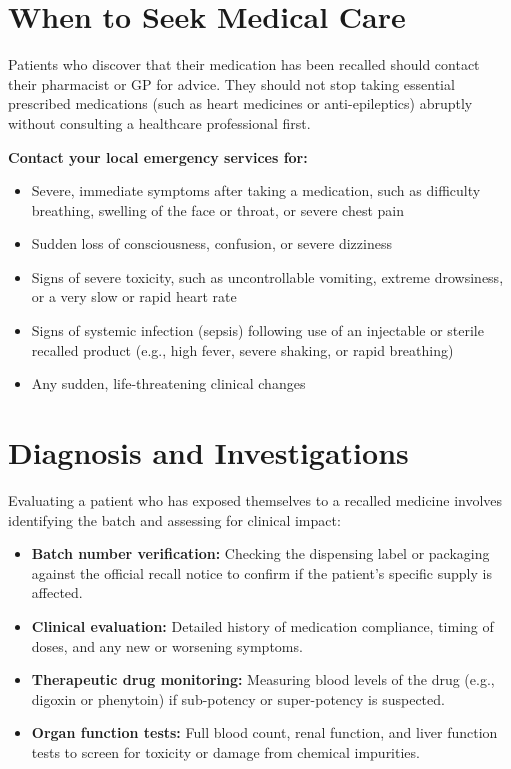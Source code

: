\section*{When to Seek Medical Care}
Patients who discover that their medication has been recalled should contact their pharmacist or GP for advice. They should not stop taking essential prescribed medications (such as heart medicines or anti-epileptics) abruptly without consulting a healthcare professional first.

\textbf{Contact your local emergency services for:}
\begin{itemize}
    \item Severe, immediate symptoms after taking a medication, such as difficulty breathing, swelling of the face or throat, or severe chest pain
    \item Sudden loss of consciousness, confusion, or severe dizziness
    \item Signs of severe toxicity, such as uncontrollable vomiting, extreme drowsiness, or a very slow or rapid heart rate
    \item Signs of systemic infection (sepsis) following use of an injectable or sterile recalled product (e.g., high fever, severe shaking, or rapid breathing)
    \item Any sudden, life-threatening clinical changes
\end{itemize}

\section*{Diagnosis and Investigations}
Evaluating a patient who has exposed themselves to a recalled medicine involves identifying the batch and assessing for clinical impact:

\begin{itemize}
    \item \textbf{Batch number verification:} Checking the dispensing label or packaging against the official recall notice to confirm if the patient's specific supply is affected.
    \item \textbf{Clinical evaluation:} Detailed history of medication compliance, timing of doses, and any new or worsening symptoms.
    \item \textbf{Therapeutic drug monitoring:} Measuring blood levels of the drug (e.g., digoxin or phenytoin) if sub-potency or super-potency is suspected.
    \item \textbf{Organ function tests:} Full blood count, renal function, and liver function tests to screen for toxicity or damage from chemical impurities.
\end{itemize}

